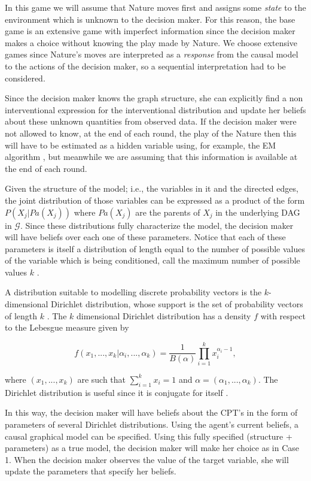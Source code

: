 \documentclass{article}
\begin{document}
In this game we will assume that Nature moves first and assigns some \textit{state} to the environment which is unknown to the decision maker. For this reason, the base game is an extensive game with imperfect information since the decision maker makes a choice without knowing the play made by Nature. We choose extensive games since Nature's moves are interpreted as a \textit{response} from the causal model to the actions of the decision maker, so a sequential interpretation had to be considered.

Since the decision maker knows the graph structure, she can explicitly find a non interventional expression for the interventional distribution and update her beliefs about these unknown quantities from observed data. If the decision maker were not allowed to know, at the end of each round, the play of the Nature then this will have to be estimated as a hidden variable using, for example, the EM algorithm \cite{dempster1977maximum}, but meanwhile we are assuming that this information is available at the end of each round.

Given the structure of the model; i.e., the variables in it and the directed edges, the joint distribution of those variables can be expressed as a product of the form $P(X_j | Pa(X_j))$ where $Pa(X_j)$ are the parents of $X_j$ in the underlying DAG in $\mathcal{G}$. Since these distributions fully characterize the model, the decision maker will have beliefs over each one of these parameters. Notice that each of these parameters is itself a distribution of length equal to the number of possible values of the variable which is being conditioned, call the maximum number of possible values $k$ . 

A distribution suitable to modelling discrete probability vectors is the $k$-dimensional Dirichlet distribution, whose support is the set of probability vectors of length $k$ \cite{hjort2010bayesian}. The $k$ dimensional Dirichlet distribution has a density $f$ with respect to the Lebesgue measure given by

\[ f(x_1,...,x_k | \alpha_i,...,\alpha_k)=\frac{1}{B(\alpha)}  \prod_{i=1}^k x_i^{\alpha_i-1},\]

where $(x_1,...,x_k)$ are such that $\sum_{i=1}^k x_i =1$ and $\alpha=(\alpha_1,...,\alpha_k)$. The Dirichlet distribution is useful since it is conjugate for itself \cite{bernardo2000bayesian}.

In this way, the decision maker will have beliefs about the CPT's in the form of parameters of several Dirichlet distributions. Using the agent's current beliefs, a causal graphical model can be specified. Using this fully specified (structure + parameters) as a true model, the decision maker will make her choice as in Case 1. When the decision maker observes the value of the target variable, she will update the parameters that specify her beliefs.
\end{document}
